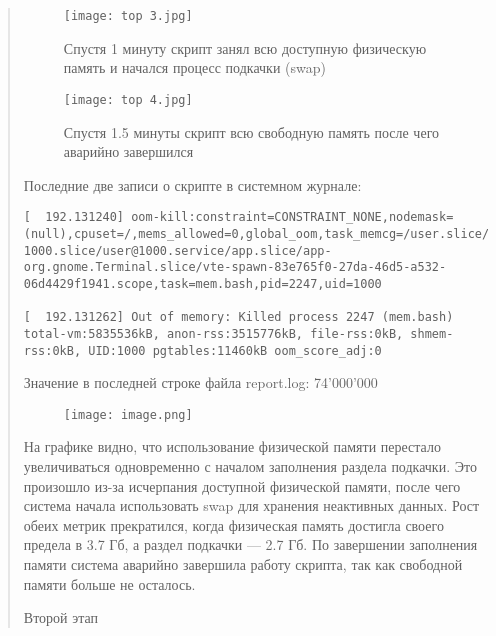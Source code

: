 \documentclass[12pt]{article}
\begin{document}
\begin{quote}
\begin{figure}[h]
    \centering
    \texttt{[image: top 3.jpg]}
    \caption{Спустя 1 минуту скрипт занял всю доступную физическую память и начался процесс подкачки (swap)}
    \label{fig:example}
\end{figure}

\begin{figure}[h]
    \centering
    \texttt{[image: top 4.jpg]}
    \caption{Спустя 1.5 минуты скрипт всю свободную память после чего аварийно завершился}
    \label{fig:example}
\end{figure}


\clearpage

\lstset{ 
  breaklines=true, 
  basicstyle=\ttfamily, 
  columns=flexible, 
  extendedchars=true
}

Последние две записи о скрипте в системном журнале: 
\begin{lstlisting}
[  192.131240] oom-kill:constraint=CONSTRAINT_NONE,nodemask=(null),cpuset=/,mems_allowed=0,global_oom,task_memcg=/user.slice/user-1000.slice/user@1000.service/app.slice/app-org.gnome.Terminal.slice/vte-spawn-83e765f0-27da-46d5-a532-06d4429f1941.scope,task=mem.bash,pid=2247,uid=1000

[  192.131262] Out of memory: Killed process 2247 (mem.bash) total-vm:5835536kB, anon-rss:3515776kB, file-rss:0kB, shmem-rss:0kB, UID:1000 pgtables:11460kB oom_score_adj:0
\end{lstlisting}

Значение в последней строке файла report.log: 74'000'000

\begin{figure}[h]
    \centering
    \texttt{[image: image.png]}
    \label{fig:example}
\end{figure}

На графике видно, что использование физической памяти перестало увеличиваться одновременно с началом заполнения раздела подкачки. Это произошло из-за исчерпания доступной физической памяти, после чего система начала использовать swap для хранения неактивных данных. Рост обеих метрик прекратился, когда физическая память достигла своего предела в 3.7 Гб, а раздел подкачки — 2.7 Гб. По завершении заполнения памяти система аварийно завершила работу скрипта, так как свободной памяти больше не осталось.

\begin{center}
    \normalsize Второй этап
\end{center}


\end{quote}
\end{document}
